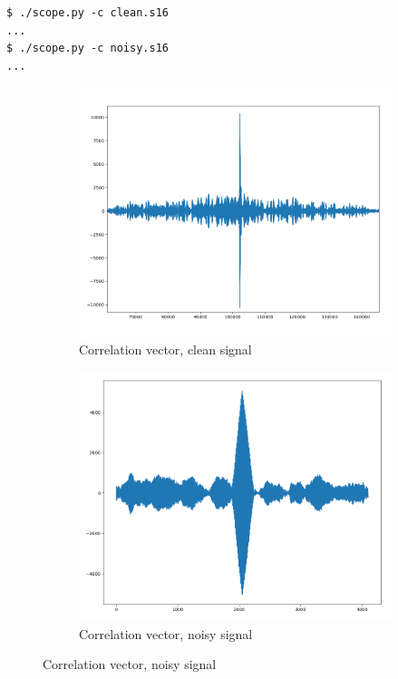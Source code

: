 \documentclass[a4paper]{article}
\begin{document}
\begin{lstlisting}
$ ./scope.py -c clean.s16
...
$ ./scope.py -c noisy.s16
...
\end{lstlisting}

\begin{figure}[H]
    \centering
    \begin{subfigure}[b]{0.45\textwidth}
        \includegraphics[width=1\textwidth]{correlation_clean.png}
        \caption{Correlation vector, clean signal}
    \end{subfigure}
    \begin{subfigure}[b]{0.45\textwidth}
        \includegraphics[width=1\textwidth]{correlation_noisy.png}
        \caption{Correlation vector, noisy signal}
    \end{subfigure}
\end{figure}
\end{document}
